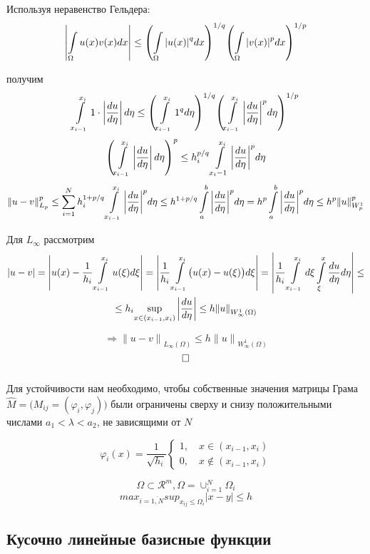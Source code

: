 Используя неравенство Гельдера:
\[ \left| \int\limits_{\Omega}^{} u(x) v(x) dx \right| \leq {\left( \int\limits_{\Omega}^{} {|u(x)|}^q dx \right)}^{1/q} {\left( \int\limits_{\Omega}^{} {|v(x)|}^p dx \right)}^{1/p} \]

получим
\[ \int\limits_{x_{i-1}}^{x_i} 1 \cdot \left|\frac{du}{d\eta}\right| d\eta \leq {\left( \int\limits_{x_{i-1}}^{x_i} {1}^q d \eta \right)}^{1/q} {\left( \int\limits_{x_{i-1}}^{x_i} {\left| \frac{du}{d \eta} \right|}^p d \eta \right)}^{1/p} \]
\[ {\left(\int\limits_{x_{i-1}}^{x_i} \left| \frac{du}{d\eta} \right| d\eta \right)}^p \leq h^{p/q}_i \int\limits_{x_i-1}^{x_i} {\left|\frac{du}{d\eta}\right|}^p d\eta \]
\[ {\|u-v\|}^p_{L_p} \leq \sum\limits_{i=1}^{N} h_i^{1+p/q} \int\limits_{x_{i-1}}^{x_i} {\left|\frac{du}{d\eta}\right|}^p  d\eta \leq h^{1+p/q} \int\limits_{a}^{b} {\left|\frac{du}{d\eta}\right|}^p d\eta = h^p \int\limits_{a}^{b} {\left|\frac{du}{d\eta}\right|}^p d\eta \leq h^p {\|u\|}^p_{W_p^1} \]

Для $L_{\infty}$ рассмотрим
\begin{multline*}
	|u - v| = \left| u(x) - \frac{1}{h_i} \int\limits_{x_{i-1}}^{x_i} u(\xi) d\xi \right| = \left| \frac{1}{h_i} \int\limits_{x_{i-1}}^{x_i} \bigl( u(x)- u(\xi) \bigr) d\xi \right| = \left| \frac{1}{h_i} \int\limits_{x_{i-1}}^{x_i} d\xi \int\limits_{\xi}^{x} \frac{du}{d\eta} d \eta \right| \leq \\
	\leq h_i \underset{x \in (x_{i-1}, x_i)}{\sup} \left| \frac{du}{d\eta} \right| \leq h {\|u\|}_{W_{\infty}^1(\Omega)}
\end{multline*}

\[  \Rightarrow {\|u -v\|}_{L_{\infty}(\Omega)} \leq h {\|u\|}_{W_\infty^1 (\Omega)} \]
\[ \hfill \square \] \\

Для устойчивости нам необходимо, чтобы собственные значения матрицы Грама $ \widehat{M} = \bigl(M_{ij} = (\varphi_i, \varphi_j)\bigr) $  были ограничены сверху и снизу положительными числами $ a_1 < \lambda < a_2 $, не зависящими от $N$

\[ {\varphi_i} (x) = \frac{1}{\sqrt{h_i}} \left\{ \begin{array}{l}
	1, \quad x \in (x_{i-1}, x_i) \\
	0, \quad x \not \in (x_{i-1}, x_i)
\end{array} \right. \]

\[ \Omega \subset \mathcal{R}^m, \Omega = \cup^{N}_{i=1} \Omega_i \]
\[ {max}_{i=\overline{1, N}} {sup}_{x_{ij} \leq \Omega_i} |x-y| \leq h \]

\subsection{Кусочно линейные базисные функции}

